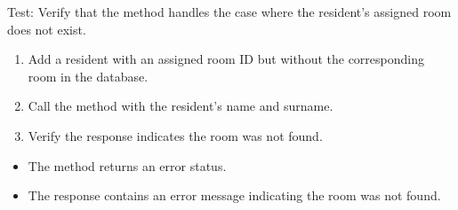 \documentclass[letterpaper,10pt,english]{sphinxmanual}
\begin{document}
\begin{fulllineitems}
\label{\detokenize{test:test.test_residetnt.test_get_resident_room_room_not_found}}
\pysigstartsignatures
\pysiglinewithargsret
{}
{}
{}
\pysigstopsignatures
\sphinxAtStartPar
Test: Verify that the method handles the case where the resident’s assigned room does not exist.
\begin{description}
\begin{enumerate}
%
\item {} 
\sphinxAtStartPar
Add a resident with an assigned room ID but without the corresponding room in the database.

\item {} 
\sphinxAtStartPar
Call the  method with the resident’s name and surname.

\item {} 
\sphinxAtStartPar
Verify the response indicates the room was not found.

\end{enumerate}

\begin{itemize}
\item {} 
\sphinxAtStartPar
The method returns an error status.

\item {} 
\sphinxAtStartPar
The response contains an error message indicating the room was not found.

\end{itemize}

\end{description}

\end{fulllineitems}

\end{document}
